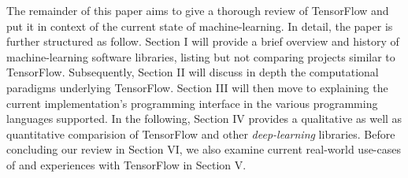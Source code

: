 The remainder of this paper aims to give a thorough review of TensorFlow and put
it in context of the current state of machine-learning. In detail, the paper is
further structured as follow. Section I will provide a brief overview and
history of machine-learning software libraries, listing but not comparing
projects similar to TensorFlow. Subsequently, Section II will discuss in depth
the computational paradigms underlying TensorFlow. Section III will then move to
explaining the current implementation's programming interface in the various
programming languages supported. In the following, Section IV provides a
qualitative as well as quantitative comparision of TensorFlow and other
\emph{deep-learning} libraries. Before concluding our review in Section VI, we
also examine current real-world use-cases of and experiences with TensorFlow in
Section V.

